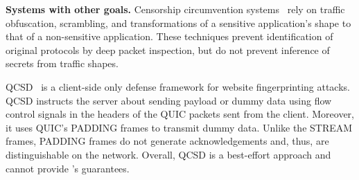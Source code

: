 \textbf{Systems with other goals.}
Censorship circumvention systems~\cite{mohajeri2012skypemorph,
winter2013scramblesuit, barradas2017deltashaper,
barradas2020poking, rosen2021balboa}
rely on traffic obfuscation, scrambling, and transformations of a sensitive
application’s shape to that of a non-sensitive application. These techniques
prevent identification of original protocols by deep packet inspection,
but do not prevent inference of secrets from traffic shapes.

QCSD~\cite{smith2022qcsd} is a client-side only defense framework for website
fingerprinting attacks. QCSD instructs the server about sending payload or dummy
data using flow control signals in the headers of the QUIC packets sent from the
client. Moreover, it uses QUIC's PADDING frames to transmit dummy data.
Unlike the STREAM frames, PADDING frames do not generate
acknowledgements \cite{rfc9000} and, thus, are distinguishable on the network.
Overall, QCSD is a best-effort approach and cannot provide {\sys}'s guarantees.
\fi

